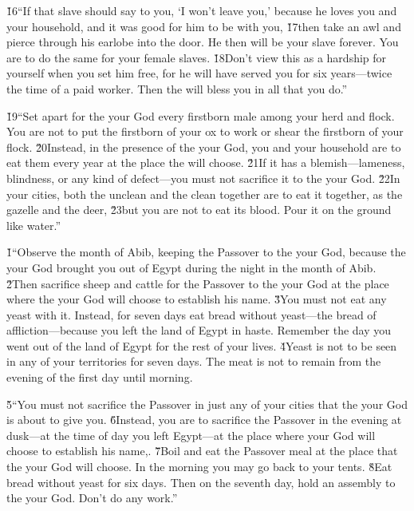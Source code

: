 \v{16}``If that slave should say to you, `I won't leave you,' because he loves you and your household, and it was good for him to be with you, \v{17}then take an awl and pierce through his earlobe into the door. He then will be your slave forever. You are to do the same for your female slaves. \v{18}Don't view this as a hardship for yourself when you set him free, for he will have served you for six years---twice the time of a paid worker. Then the  will bless you in all that you do.''

\v{19}``Set apart for the  your God every firstborn male among your herd and flock. You are not to put the firstborn of your ox to work or shear the firstborn of your flock. \v{20}Instead, in the presence of the  your God, you and your household are to eat them every year at the place the  will choose. \v{21}If it has a blemish---lameness, blindness, or any kind of defect---you must not sacrifice it to the  your God. \v{22}In your cities, both the unclean and the clean together are to eat it together, as the gazelle and the deer, \v{23}but you are not to eat its blood. Pour it on the ground like water.''

\v{1}``Observe the month of Abib, keeping the Passover to the  your God, because the  your God brought you out of Egypt during the night in the month of Abib. \v{2}Then sacrifice sheep and cattle for the Passover to the  your God at the place where the  your God will choose to establish his name. \v{3}You must not eat any yeast with it. Instead, for seven days eat bread without yeast---the bread of affliction---because you left the land of Egypt in haste. Remember the day you went out of the land of Egypt for the rest of your lives. \v{4}Yeast is not to be seen in any of your territories for seven days. The meat is not to remain from the evening of the first day until morning.

\v{5}``You must not sacrifice the Passover in just any of your cities that the  your God is about to give you. \v{6}Instead, you are to sacrifice the Passover in the evening at dusk---at the time of day you left Egypt---at the place where your God will choose to establish his name,. \v{7}Boil and eat the Passover meal at the place that the  your God will choose. In the morning you may go back to your tents. \v{8}Eat bread without yeast for six days. Then on the seventh day, hold an assembly to the  your God. Don't do any work.''

